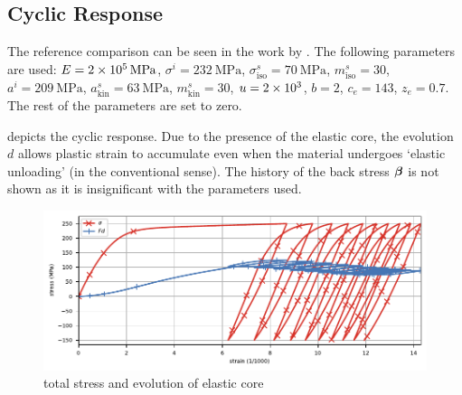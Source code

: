\subsection{Cyclic Response}
The reference comparison can be seen in the work by \citet{Hassan2008,Hashiguchi2017a}.
The following parameters are used:
$E=\SI{2E5}{\mega\pascal}$,
$\sigma^i=\SI{232}{\mega\pascal}$,
$\sigma^s_\text{iso}=\SI{70}{\mega\pascal}$,
$m^s_\text{iso}=\num{30}$,
$a^i=\SI{209}{\mega\pascal}$,
$a^s_\text{kin}=\SI{63}{\mega\pascal}$,
$m^s_\text{kin}=\num{30}$,
$u=\num{2E3}$,
$b=\num{2}$,
$c_e=\num{143}$,
$z_e=\num{0.7}$.
The rest of the parameters are set to zero.

 depicts the cyclic response.
Due to the presence of the elastic core, the evolution $d$ allows plastic strain to accumulate even when the material undergoes `elastic unloading' (in the conventional sense).
The history of the back stress $\bm{\beta}$ is not shown as it is insignificant with the parameters used.
\begin{figure}[htb]
\centering
\includegraphics{PIC/CYCLIC/cyclic.total.pdf}
\caption{total stress and evolution of elastic core}\label{fig:cyclic_total}
\end{figure}

